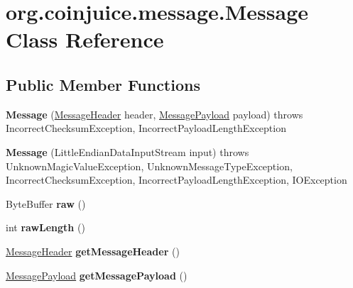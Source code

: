\hypertarget{classorg_1_1coinjuice_1_1message_1_1_message}{\section{org.\-coinjuice.\-message.\-Message Class Reference}
\label{classorg_1_1coinjuice_1_1message_1_1_message}
}
\subsection*{Public Member Functions}
\begin{DoxyCompactItemize}
\item 
\hypertarget{classorg_1_1coinjuice_1_1message_1_1_message_a15f4f9d63a8fce26f1c1135265227dfa}{{\bfseries Message} (\hyperlink{classorg_1_1coinjuice_1_1message_1_1_message_header}{Message\-Header} header, \hyperlink{classorg_1_1coinjuice_1_1message_1_1_message_payload}{Message\-Payload} payload)  throws Incorrect\-Checksum\-Exception, Incorrect\-Payload\-Length\-Exception }\label{classorg_1_1coinjuice_1_1message_1_1_message_a15f4f9d63a8fce26f1c1135265227dfa}

\item 
\hypertarget{classorg_1_1coinjuice_1_1message_1_1_message_ab7960c708b3d8432b17516d4ef3e3a20}{{\bfseries Message} (Little\-Endian\-Data\-Input\-Stream input)  throws Unknown\-Magic\-Value\-Exception, Unknown\-Message\-Type\-Exception, Incorrect\-Checksum\-Exception, Incorrect\-Payload\-Length\-Exception, I\-O\-Exception }\label{classorg_1_1coinjuice_1_1message_1_1_message_ab7960c708b3d8432b17516d4ef3e3a20}

\item 
\hypertarget{classorg_1_1coinjuice_1_1message_1_1_message_a5af81e3a5236d946fd35ee3211139fd1}{Byte\-Buffer {\bfseries raw} ()}\label{classorg_1_1coinjuice_1_1message_1_1_message_a5af81e3a5236d946fd35ee3211139fd1}

\item 
\hypertarget{classorg_1_1coinjuice_1_1message_1_1_message_a30743df9064d4238d7e4474d1aaf225a}{int {\bfseries raw\-Length} ()}\label{classorg_1_1coinjuice_1_1message_1_1_message_a30743df9064d4238d7e4474d1aaf225a}

\item 
\hypertarget{classorg_1_1coinjuice_1_1message_1_1_message_a7bc430f4cf122dc93fc08842af807093}{\hyperlink{classorg_1_1coinjuice_1_1message_1_1_message_header}{Message\-Header} {\bfseries get\-Message\-Header} ()}\label{classorg_1_1coinjuice_1_1message_1_1_message_a7bc430f4cf122dc93fc08842af807093}

\item 
\hypertarget{classorg_1_1coinjuice_1_1message_1_1_message_af6dbe71eb471251fbfd88cd88fc3df01}{\hyperlink{classorg_1_1coinjuice_1_1message_1_1_message_payload}{Message\-Payload} {\bfseries get\-Message\-Payload} ()}\label{classorg_1_1coinjuice_1_1message_1_1_message_af6dbe71eb471251fbfd88cd88fc3df01}

\end{DoxyCompactItemize}
